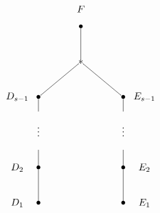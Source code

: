 \[
\xygraph{
  !{<0cm,0cm>;<1.5cm,0cm>:<0cm,1.25cm>::}
  !{(2,5.5) }*{F}
  !{(2,5) }*{\bullet}="f"
  !{(2,4) }*{\ast}="triple"
  !{(.5,3) }*{D_{s-1}}
  !{(1,3) }*{\bullet}="ds"
  !{(1,2.6) }*{}="dabove"
  !{(1,2.1) }*{\vdots}="dspace"
  !{(1,1.5) }*{}="dbelow"
  !{(1,1) }*{\bullet}="d2"
  !{(.5,1) }*{D_2}
  !{(1,0) }*{\bullet}="d1"
  !{(.5,0) }*{D_1}
  !{(3.5,3) }*{E_{s-1}}
  !{(3,3) }*{\bullet}="es"
  !{(3,2.6) }*{}="eabove"
  !{(3,2.1) }*{\vdots}="espace"
  !{(3,1.5) }*{}="ebelow"
  !{(3,1) }*{\bullet}="e2"
  !{(3.5,1) }*{E_2}
  !{(3,0) }*{\bullet}="e1"
  !{(3.5,0) }*{E_1}
  "f"-"triple"
  "triple"-"ds"
  "ds"-"dabove"
  "dbelow"-"d2"
  "d2"-"d1"
  "triple"-"es"
  "es"-"eabove"
  "ebelow"-"e2"
  "e2"-"e1"
}
\]



